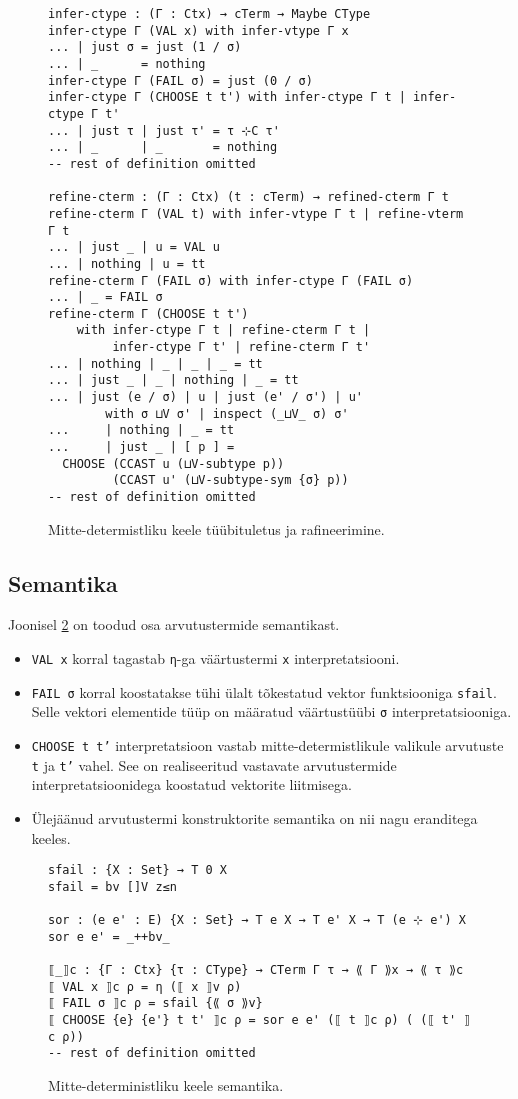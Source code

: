 \documentclass[a4paper,12pt]{article}
\begin{document}
\begin{figure}
  \begin{BVerbatim}
infer-ctype : (Γ : Ctx) → cTerm → Maybe CType
infer-ctype Γ (VAL x) with infer-vtype Γ x
... | just σ = just (1 / σ)
... | _      = nothing
infer-ctype Γ (FAIL σ) = just (0 / σ)
infer-ctype Γ (CHOOSE t t') with infer-ctype Γ t | infer-ctype Γ t'
... | just τ | just τ' = τ ⊹C τ'
... | _      | _       = nothing
-- rest of definition omitted

refine-cterm : (Γ : Ctx) (t : cTerm) → refined-cterm Γ t
refine-cterm Γ (VAL t) with infer-vtype Γ t | refine-vterm Γ t
... | just _ | u = VAL u
... | nothing | u = tt 
refine-cterm Γ (FAIL σ) with infer-ctype Γ (FAIL σ)
... | _ = FAIL σ
refine-cterm Γ (CHOOSE t t')
    with infer-ctype Γ t | refine-cterm Γ t |
         infer-ctype Γ t' | refine-cterm Γ t'
... | nothing | _ | _ | _ = tt
... | just _ | _ | nothing | _ = tt
... | just (e / σ) | u | just (e' / σ') | u'
        with σ ⊔V σ' | inspect (_⊔V_ σ) σ'
...     | nothing | _ = tt
...     | just _ | [ p ] =
  CHOOSE (CCAST u (⊔V-subtype p))
         (CCAST u' (⊔V-subtype-sym {σ} p))
-- rest of definition omitted
  \end{BVerbatim}
  \caption{Mitte-determistliku keele tüübituletus ja rafineerimine.}
  \label{fig:nd.refine}
\end{figure}


\subsection{Semantika}

Joonisel \ref{fig:nd.semantics} on toodud osa arvutustermide semantikast.
\begin{itemize}
\item {\tt VAL x} korral tagastab {\tt η}-ga väärtustermi {\tt x} interpretatsiooni.
\item {\tt FAIL σ} korral koostatakse tühi ülalt tõkestatud vektor funktsiooniga {\tt sfail}. Selle vektori elementide tüüp on määratud väärtustüübi {\tt σ} interpretatsiooniga.
\item {\tt CHOOSE t t'} interpretatsioon vastab mitte-determistlikule valikule arvutuste {\tt t} ja {\tt t'} vahel. See on realiseeritud vastavate arvutustermide interpretatsioonidega koostatud vektorite liitmisega.
\item Ülejäänud arvutustermi konstruktorite semantika on nii nagu eranditega keeles.
\end{itemize}
\begin{figure}
  \begin{BVerbatim}
sfail : {X : Set} → T 0 X
sfail = bv []V z≤n

sor : (e e' : E) {X : Set} → T e X → T e' X → T (e ⊹ e') X
sor e e' = _++bv_

⟦_⟧c : {Γ : Ctx} {τ : CType} → CTerm Γ τ → ⟪ Γ ⟫x → ⟪ τ ⟫c
⟦ VAL x ⟧c ρ = η (⟦ x ⟧v ρ)
⟦ FAIL σ ⟧c ρ = sfail {⟪ σ ⟫v}
⟦ CHOOSE {e} {e'} t t' ⟧c ρ = sor e e' (⟦ t ⟧c ρ) ( (⟦ t' ⟧c ρ))
-- rest of definition omitted
  \end{BVerbatim}
  \caption{Mitte-deterministliku keele semantika.}
  \label{fig:nd.semantics}
\end{figure}
\end{document}
